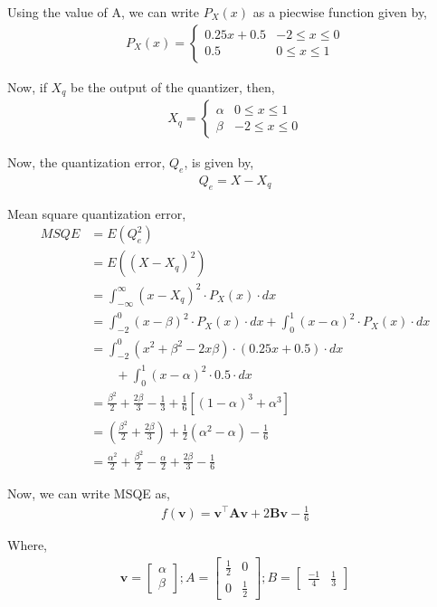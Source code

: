 \documentclass[]{article}
\begin{document}
Using the value of A, we can write $P_X(x)$ as a piecwise function given by,
\begin{align}
    P_X(x) = 
    \begin{cases}
        0.25x + 0.5 & -2\leq x\leq 0 \\
        0.5 & 0\leq x \leq1
    \end{cases}
\end{align}

Now, if $X_q$ be the output of the quantizer, then,
\begin{align}
    X_q = 
    \begin{cases}
        \alpha & 0\leq x \leq1 \\
        \beta & -2\leq x\leq 0
    \end{cases}
\end{align}

Now, the quantization error, $Q_e$, is given by,
\begin{align}
    Q_e = X-X_q
\end{align}

Mean square quantization error, 
\begin{align}
    MSQE &= E(Q_e^2) \\
    &= E((X-X_q)^2) \\
    &= \int_{-\infty}^{\infty}(x-X_q)^2\cdot P_X(x)\cdot dx \\
    &= \int_{-2}^{0}(x-\beta)^2\cdot P_X(x)\cdot dx + \int_{0}^{1}(x-\alpha)^2\cdot P_X(x)\cdot dx \\
    &= \int_{-2}^{0}(x^2+\beta ^2-2x\beta)\cdot (0.25x+0.5)\cdot dx \\ &\qquad + \int_{0}^{1}(x-\alpha)^2\cdot 0.5\cdot dx \\
    &= \frac{\beta ^2}{2} + \frac{2\beta}{3} -\frac{1}{3} + \frac{1}{6}[(1-\alpha)^3+\alpha ^3] \\
    &= (\frac{\beta ^2}{2} + \frac{2\beta}{3}) + \frac{1}{2}(\alpha ^2 - \alpha) - \frac{1}{6} \\
    &= \frac{\alpha ^2}{2} + \frac{\beta ^2}{2} - \frac{\alpha}{2} + \frac{2\beta}{3} - \frac{1}{6} 
\end{align}

Now, we can write MSQE as,
\begin{align}
    f(\mathbf{v}) = \mathbf{v}^\intercal \mathbf{A} \mathbf{v} + 2 \mathbf{B} \mathbf{v} - \frac{1}{6}
\end{align}

Where, 
\begin{align}
    \mathbf{v} = 
    \begin{bmatrix}
        \alpha \\
        \beta
    \end{bmatrix};
    A =
    \begin{bmatrix}
        \frac{1}{2} & 0 \\
        0 & \frac{1}{2}
    \end{bmatrix}; 
    B = 
    \begin{bmatrix}
        \frac{-1}{4} & \frac{1}{3}
    \end{bmatrix}
\end{align}
\end{document}
